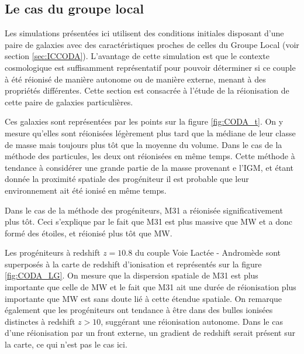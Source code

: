 \subsection{Le cas du groupe local}

Les simulations présentées ici utilisent des conditions initiales disposant d'une paire de galaxies avec des caractéristiques proches de celles du Groupe Local (voir section \ref{sec:ICCODA}).
L'avantage de cette simulation est que le contexte cosmologique est suffisamment représentatif pour pouvoir déterminer si ce couple à été réionisé de manière autonome ou de manière externe, menant à des propriétés différentes.
Cette section est consacrée à l'étude de la réionisation de cette paire de galaxies particulières.

Ces galaxies sont représentées par les points sur la figure \ref{fig:CODA_t}. 
On y mesure qu'elles sont réionisées légèrement plus tard que la médiane de leur classe de masse mais toujours plus tôt que la moyenne du volume.
Dans le cas de la méthode des particules, les deux ont réionisées en même temps.
Cette méthode à tendance à considérer une grande partie de la masse provenant e l'\ac{IGM}, et étant donnée la proximité spatiale des progéniteur il est probable que leur environnement ait été ionisé en même temps.

Dans le cas de la méthode des progéniteurs, M31 a réionisée significativement plus tôt.
Ceci s'explique par le fait que M31 est plus massive que MW %
et a donc formé des étoiles, et réionisé plus tôt que MW.



Les progéniteurs à redshift $z=10.8$ du couple Voie Lactée - Andromède sont superposés à la carte de redshift d'ionisation et représentés sur la figure \ref{fig:CODA_LG}.
On mesure que la dispersion spatiale de M31 est plus importante que celle de MW et le fait que M31 ait une durée de réionisation plus importante que MW est sans doute lié à cette étendue spatiale.
On remarque également que les progéniteurs ont tendance à être dans des bulles ionisées distinctes à redshift $z>10$, suggérant une réionisation autonome.
Dans le cas d'une réionisation par un front externe, un gradient de redshift serait présent sur la carte, ce qui n'est pas le cas ici.

